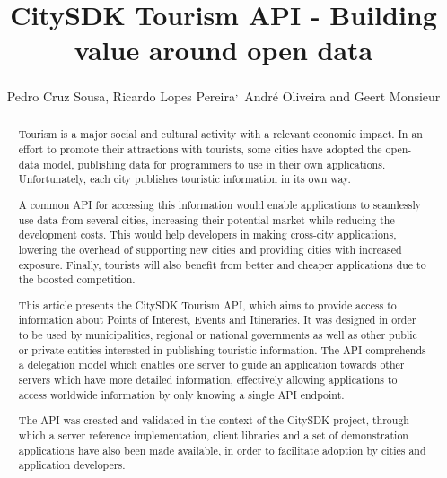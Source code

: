\documentclass[times,doublespace]{ettauth}%
\begin{document}




\title{CitySDK Tourism API - Building value around open data}
\author{Pedro Cruz Sousa,
Ricardo Lopes Pereira\textsuperscript{,}\corrauth\,
Andr\'e Oliveira and 
Geert Monsieur}
\address{%
 Instituto Superior T\'ecnico, Avenida Rovisco Pais 1, 1049-001 Lisboa, Portugal\\
 INESC-ID, Av. Prof. Dr. Cavaco Silva, 2744-016 Porto Salvo, Portugal\\
 ISA - Intelligent Sensing Anywhere S.A, Rua D. Manuel I, 30, 3030-320 Coimbra, Portugal\\
 European Research Institute in Service Science (ERISS), Tilburg University, Warandelaan 2, 5037AB Tilburg, The Netherlands%
}

\begin{abstract}
Tourism is a major social and cultural activity with a relevant economic impact.
In an effort to promote their attractions with tourists, some cities have adopted the open-data model, publishing data for programmers to use in their own applications.
Unfortunately, each city publishes touristic information in its own way.

A common API for accessing this information would enable applications to seamlessly use data from several cities, increasing their potential market while reducing the development costs.
This would help developers in making cross-city applications, lowering the overhead of supporting new cities and providing cities with increased exposure. Finally, tourists will also benefit from better and cheaper applications due to the boosted competition.

This article presents the CitySDK Tourism API, which aims to provide access to information about Points of Interest, Events and Itineraries.
It was designed in order to be used by municipalities, regional or national governments as well as other public or private entities interested in publishing touristic information.
The API comprehends a delegation model which enables one server to guide an application towards other servers which have more detailed information, effectively allowing applications to access worldwide information by only knowing a single API endpoint.

The API was created and validated in the context of the CitySDK project, through which a server reference implementation, client libraries and a set of demonstration applications have also been made available, in order to facilitate adoption by cities and application developers.

\end{abstract}
\end{document}
